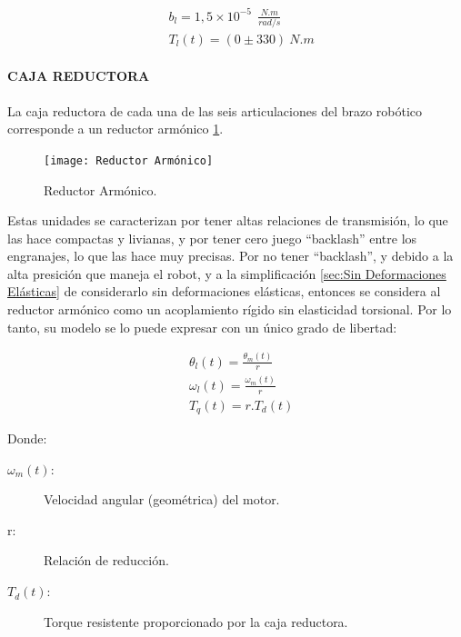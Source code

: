 \documentclass{article}
\begin{document}
\begin{sloppypar}
\begin{subequations} \label{eq:Valor de b_l y de b_l}
    \begin{align}
        & \label{eq:Valor de b_l}  b_l=1,5\times10^{-5}\ \ \frac{N.m}{rad/s}
        \\
        & \label{eq:Valor de T_l}  T_l(t)=(0\pm330)\ N.m
    \end{align}
\end{subequations}






\paragraph{CAJA REDUCTORA}
\label{sec:CAJA REDUCTORA}
\hfill

\hfill


La caja reductora de cada una de las seis articulaciones del brazo robótico corresponde a un reductor armónico \ref{fig:Reductor Armónico}.

\begin{figure}[H]
    \centering
    \texttt{[image: Reductor Armónico]}
    \caption{Reductor Armónico.}
    \label{fig:Reductor Armónico}
\end{figure}

Estas unidades se caracterizan por tener altas relaciones de transmisión, lo que las hace compactas y livianas, y por tener cero juego “backlash” entre los engranajes, lo que las hace muy precisas.
Por no tener “backlash”, y debido a la alta presición que maneja el robot, y a la simplificación \ref{sec:Sin Deformaciones Elásticas} de considerarlo sin deformaciones elásticas, entonces se considera al reductor armónico como un acoplamiento rígido sin elasticidad torsional. Por lo tanto, su modelo se lo puede expresar con un único grado de libertad:

\begin{subequations} \label{eq:theta_l, omega_l y T_q}
    \begin{align}
        & \label{eq:theta_l}   \theta_l(t)=\frac{\theta_m(t)}{r}
        \\
        & \label{eq:omega_l}   \omega_l(t)=\frac{\omega_m(t)}{r}
        \\
        & \label{eq:T_q}   T_q(t)=r.T_d(t)
    \end{align}
\end{subequations}

Donde:
\begin{description}
    \item[$\omega_m\left(t\right):$] Velocidad angular (geométrica) del motor.
    \item[r:] Relación de reducción.
    \item[$T_d(t):$] Torque resistente proporcionado por la caja reductora.
\end{description}


\end{sloppypar}
\end{document}
